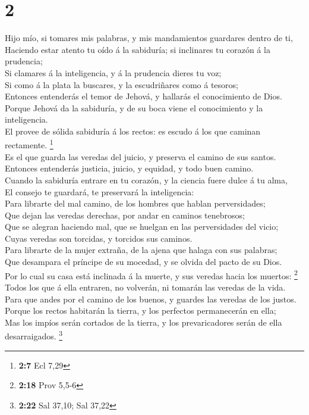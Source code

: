\hypertarget{section-1}{%
\section{2}\label{section-1}}

 Hijo mío, si tomares mis palabras, y mis mandamientos
guardares dentro de ti,\\
 Haciendo estar atento tu oído á la sabiduría; si inclinares
tu corazón á la prudencia;\\
 Si clamares á la inteligencia, y á la prudencia dieres tu
voz;\\
 Si como á la plata la buscares, y la escudriñares como á
tesoros;\\
 Entonces entenderás el temor de Jehová, y hallarás el
conocimiento de Dios.\\
 Porque Jehová da la sabiduría, y de su boca viene el
conocimiento y la inteligencia.\\
 El provee de sólida sabiduría á los rectos: es escudo á los
que caminan rectamente. \footnote{\textbf{2:7} Ecl 7,29}\\
 Es el que guarda las veredas del juicio, y preserva el
camino de sus santos.\\
 Entonces entenderás justicia, juicio, y equidad, y todo
buen camino.\\
 Cuando la sabiduría entrare en tu corazón, y la ciencia
fuere dulce á tu alma,\\
 El consejo te guardará, te preservará la inteligencia:\\
 Para librarte del mal camino, de los hombres que hablan
perversidades;\\
 Que dejan las veredas derechas, por andar en caminos
tenebrosos;\\
 Que se alegran haciendo mal, que se huelgan en las
perversidades del vicio;\\
 Cuyas veredas son torcidas, y torcidos sus caminos.\\
 Para librarte de la mujer extraña, de la ajena que halaga
con sus palabras;\\
 Que desampara el príncipe de su mocedad, y se olvida del
pacto de su Dios.\\
 Por lo cual su casa está inclinada á la muerte, y sus
veredas hacia los muertos: \footnote{\textbf{2:18} Prov 5,5-6}\\
 Todos los que á ella entraren, no volverán, ni tomarán las
veredas de la vida.\\
 Para que andes por el camino de los buenos, y guardes las
veredas de los justos.\\
 Porque los rectos habitarán la tierra, y los perfectos
permanecerán en ella;\\
 Mas los impíos serán cortados de la tierra, y los
prevaricadores serán de ella desarraigados. \footnote{\textbf{2:22} Sal
  37,10; Sal 37,22}

